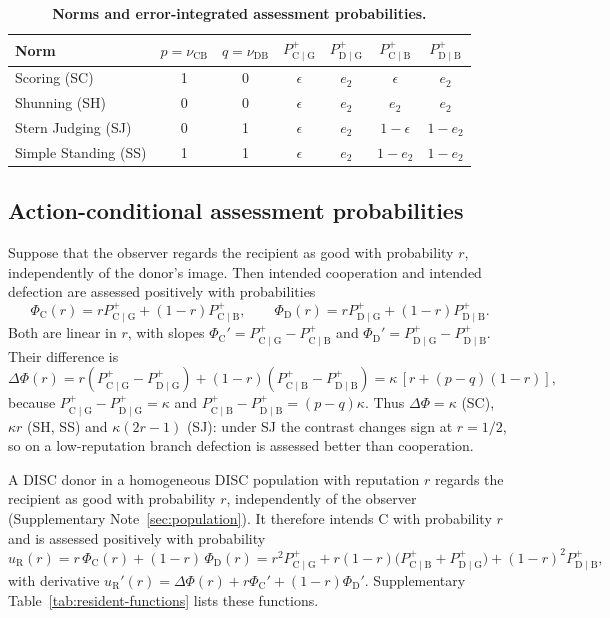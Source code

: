 \documentclass[fleqn,10pt]{article}
\theoremstyle{plain}
\theoremstyle{remark}
\newcommand{\B}{\mathrm B}
\newcommand{\C}{\mathrm C}
\newcommand{\D}{\mathrm D}
\newcommand{\Pp}[2]{P^+_{\mathrm{#1}\mid\mathrm{#2}}}
\begin{document}
\begin{table}[htbp]
\centering\small
\caption{\textbf{Norms and error-integrated assessment probabilities.}}
\label{tab:norms}
\begin{tabular}{@{}lcccccc@{}}
\toprule
Norm & $p=\nu_{\C\B}$ & $q=\nu_{\D\B}$ & $\Pp CG$ & $\Pp DG$ & $\Pp CB$ & $\Pp DB$\\
\midrule
Scoring (SC) & 1 & 0 & $\epsilon$ & $e_2$ & $\epsilon$ & $e_2$\\
Shunning (SH) & 0 & 0 & $\epsilon$ & $e_2$ & $e_2$ & $e_2$\\
Stern Judging (SJ) & 0 & 1 & $\epsilon$ & $e_2$ & $1-\epsilon$ & $1-e_2$\\
Simple Standing (SS) & 1 & 1 & $\epsilon$ & $e_2$ & $1-e_2$ & $1-e_2$\\
\bottomrule
\end{tabular}
\end{table}

\subsection{Action-conditional assessment probabilities}
Suppose that the observer regards the recipient as good with probability $r$,
independently of the donor's image. Then intended cooperation and intended
defection are assessed positively with probabilities
\begin{equation}
\Phi_\C(r)=r\Pp CG+(1-r)\Pp CB,\qquad
\Phi_\D(r)=r\Pp DG+(1-r)\Pp DB .
\label{eq:S-Phi}
\end{equation}
Both are linear in $r$, with slopes $\Phi_\C'=\Pp CG-\Pp CB$ and
$\Phi_\D'=\Pp DG-\Pp DB$. Their difference is
\begin{equation}
\Delta\Phi(r)=r(\Pp CG-\Pp DG)+(1-r)(\Pp CB-\Pp DB)=\kappa\,[r+(p-q)(1-r)],
\label{eq:S-contrast}
\end{equation}
because $\Pp CG-\Pp DG=\kappa$ and $\Pp CB-\Pp DB=(p-q)\kappa$. Thus
$\Delta\Phi=\kappa$ (SC), $\kappa r$ (SH, SS) and $\kappa(2r-1)$ (SJ): under SJ the
contrast changes sign at $r=1/2$, so on a low-reputation branch defection is
assessed better than cooperation.

A DISC donor in a homogeneous DISC population with reputation $r$ regards the
recipient as good with probability $r$, independently of the observer
(Supplementary Note~\ref{sec:population}). It therefore intends $\C$ with
probability $r$ and is assessed positively with probability
\begin{equation}
u_{\mathrm R}(r)=r\,\Phi_\C(r)+(1-r)\,\Phi_\D(r)
=r^2\Pp CG+r(1-r)\bigl(\Pp CB+\Pp DG\bigr)+(1-r)^2\Pp DB,
\label{eq:S-uR}
\end{equation}
with derivative $u_{\mathrm R}'(r)=\Delta\Phi(r)+r\Phi_\C'+(1-r)\Phi_\D'$.
Supplementary Table~\ref{tab:resident-functions} lists these functions.
\end{document}
